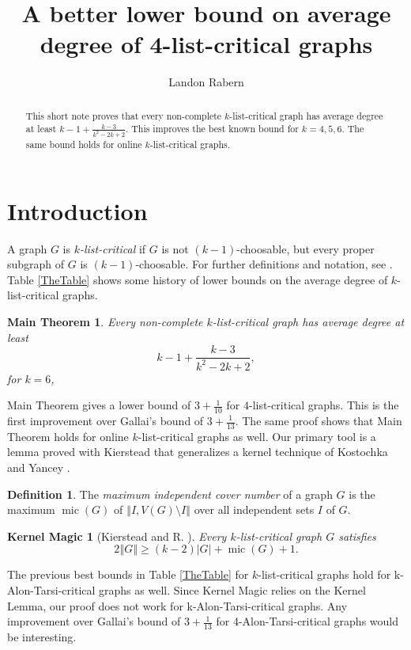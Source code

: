 \documentclass[12pt]{article}
\title{A better lower bound on average degree of 4-list-critical graphs}
\author{Landon Rabern}
\theoremstyle{plain}
\newtheorem*{KernelMagic}{Kernel Magic}
\newtheorem*{MainTheorem}{Main Theorem}
\theoremstyle{definition}
\newtheorem*{TheDefinition}{Definition}
\theoremstyle{remark}
\newcommand{\card}[1]{\left|#1\right|}
\newcommand{\size}[1]{\left\Vert#1\right\Vert}
\newcommand{\mic}{\operatorname{mic}}
\begin{document}
\maketitle
\begin{abstract}
		This short note proves that every non-complete $k$-list-critical graph has average degree at least $k-1 + \frac{k-3}{k^2-2k+2}$.  This improves the best known bound for $k = 4,5,6$.
		The same bound holds for online $k$-list-critical graphs.
\end{abstract}

\section{Introduction}
A graph $G$ is \emph{$k$-list-critical} if $G$ is not $(k-1)$-choosable, but every
proper subgraph of $G$ is $(k-1)$-choosable.  For further definitions and notation, see \cite{OreVizing, DischargingLowerBound}. 
Table \ref{TheTable} shows some history of lower bounds on the average degree of $k$-list-critical graphs.

\begin{MainTheorem}
	Every non-complete $k$-list-critical graph has average degree at least \[k-1 + \frac{k-3}{k^2-2k+2},\]
	for $k=6$, 
\end{MainTheorem}

Main Theorem gives a lower bound of $3 + \frac{1}{10}$ for $4$-list-critical graphs. This is the first improvement over Gallai's bound of $3 + \frac{1}{13}$. 
The same proof shows that Main Theorem holds for online $k$-list-critical graphs as well.  Our primary tool is a lemma proved with Kierstead \cite{KernelMagic} 
that generalizes a kernel technique of Kostochka and Yancey \cite{kostochkayancey2012ore}.

\begin{TheDefinition} The \emph{maximum independent cover number }of a graph $G$
	is the maximum $\mic(G)$ of $\size{I, V(G) \setminus I}$ over all independent sets $I$
	of $G$. 
\end{TheDefinition}

\begin{KernelMagic}[Kierstead and R. \cite{KernelMagic}]\label{ConsantListMicStrength} 
	Every $k$-list-critical graph $G$ satisfies
	\[2\size{G} \ge (k-2)\card{G} + \mic(G) + 1.\]
\end{KernelMagic}
The previous best bounds in Table \ref{TheTable} for $k$-list-critical graphs hold for k-Alon-Tarsi-critical graphs as well. Since Kernel Magic relies on the Kernel Lemma, 
our proof does not work for k-Alon-Tarsi-critical graphs.  Any improvement over Gallai's bound of $3 + \frac{1}{13}$ for 4-Alon-Tarsi-critical graphs would be interesting.
\end{document}
